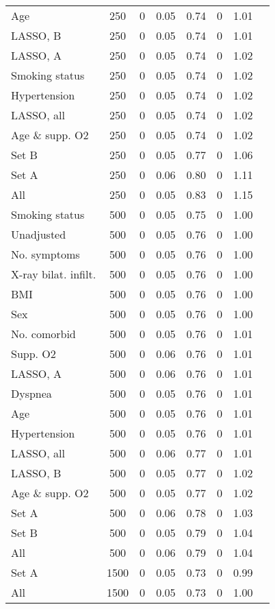 \documentclass{article}
\begin{document}
{\begin{longtable}{lccccccc}
Age & 250 & 0 & 0.05 & 0.74 & 0 & 1.01\\
LASSO, B & 250 & 0 & 0.05 & 0.74 & 0 & 1.01\\
LASSO, A & 250 & 0 & 0.05 & 0.74 & 0 & 1.02\\
Smoking status & 250 & 0 & 0.05 & 0.74 & 0 & 1.02\\
Hypertension & 250 & 0 & 0.05 & 0.74 & 0 & 1.02\\
LASSO, all & 250 & 0 & 0.05 & 0.74 & 0 & 1.02\\
Age \& supp. O2 & 250 & 0 & 0.05 & 0.74 & 0 & 1.02\\
Set B & 250 & 0 & 0.05 & 0.77 & 0 & 1.06\\
Set A & 250 & 0 & 0.06 & 0.80 & 0 & 1.11\\
All & 250 & 0 & 0.05 & 0.83 & 0 & 1.15\\ \midrule
Smoking status & 500 & 0 & 0.05 & 0.75 & 0 & 1.00\\
Unadjusted & 500 & 0 & 0.05 & 0.76 & 0 & 1.00\\
No. symptoms & 500 & 0 & 0.05 & 0.76 & 0 & 1.00\\
X-ray bilat. infilt. & 500 & 0 & 0.05 & 0.76 & 0 & 1.00\\
BMI & 500 & 0 & 0.05 & 0.76 & 0 & 1.00\\
Sex & 500 & 0 & 0.05 & 0.76 & 0 & 1.00\\
No. comorbid & 500 & 0 & 0.05 & 0.76 & 0 & 1.01\\
Supp. O2 & 500 & 0 & 0.06 & 0.76 & 0 & 1.01\\
LASSO, A & 500 & 0 & 0.06 & 0.76 & 0 & 1.01\\
Dyspnea & 500 & 0 & 0.05 & 0.76 & 0 & 1.01\\
Age & 500 & 0 & 0.05 & 0.76 & 0 & 1.01\\
Hypertension & 500 & 0 & 0.05 & 0.76 & 0 & 1.01\\
LASSO, all & 500 & 0 & 0.06 & 0.77 & 0 & 1.01\\
LASSO, B & 500 & 0 & 0.05 & 0.77 & 0 & 1.02\\
Age \& supp. O2 & 500 & 0 & 0.05 & 0.77 & 0 & 1.02\\
Set A & 500 & 0 & 0.06 & 0.78 & 0 & 1.03\\
Set B & 500 & 0 & 0.05 & 0.79 & 0 & 1.04\\
All & 500 & 0 & 0.06 & 0.79 & 0 & 1.04\\ \midrule
Set A & 1500 & 0 & 0.05 & 0.73 & 0 & 0.99\\
All & 1500 & 0 & 0.05 & 0.73 & 0 & 1.00\\

\end{longtable}}
\end{document}
